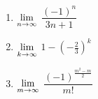\begin{multicols}{3}
\begin{enumerate}
\setcounter{enumi}{\value{HW}}

\item\label{limsqueezefirst}  $\displaystyle{\lim_{n \rightarrow \infty}}$ $\dfrac{(-1)^{n}}{3n+1}$

\item  $\displaystyle{\lim_{k \rightarrow \infty}}$ $1 - \left( - \frac{2}{3}  \right)^{k} $

\item\label{limsqueezelast}  $\displaystyle{\lim_{m \rightarrow \infty}}$ $\dfrac{(-1)^{ \frac{m^2-m}{2}} }{m!}$

\setcounter{HW}{\value{enumi}}
\end{enumerate}
\end{multicols}





